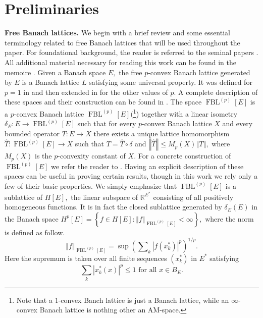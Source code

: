 \documentclass[12pt]{article}%
\begin{document}
\section{Preliminaries}

\textbf{Free Banach lattices. }We begin with a brief review and some essential
terminology related to free Banach lattices that will be used throughout the
paper. For foundational background, the reader is referred to the seminal
papers \cite{L-332,L-403}. All additional material necessary for reading this
work can be found in the memoire \cite{L-925}. Given a Banach space $E,$ the
free $p$-convex Banach lattice generated by $E$ is a Banach lattice $L$
satisfying some universal property. It was defined for $p=1$ in \cite{L-403}
and then extended in \cite{L-742} for the other values of $p.$ A complete
description of these spaces and their construction can be found in
\cite{L-925}. The space $\operatorname*{FBL}\nolimits^{(p)}\left[  E\right]  $
is a $p$-convex  Banach lattice $\operatorname*{FBL}\nolimits^{(p)}\left[
E\right]  ($\footnote{Note that a $1$-convex Banch lattice is just a Banach
lattice, while an $\infty$-convex Banach lattice is nothing other an
AM-space.}) together with a linear isometry $\delta_{E}:E\longrightarrow
\operatorname*{FBL}\nolimits^{(p)}\left[  E\right]  $ such that for every
$p$-convex Banach lattice $X$ and every bounded operator $T:E\longrightarrow
X$ there exists a unique lattice homomorphism $\widehat{T}:\operatorname*{FBL}%
\nolimits^{(p)}\left[  E\right]  \longrightarrow X$ such that $T=\widehat
{T}\circ\delta$ and $\left\Vert \widehat{T}\right\Vert \leq M_{p}\left(
X\right)  \left\Vert T\right\Vert ,$ where $M_{p}\left(  X\right)  $ is the
$p$-convexity constant of $X.$ For a concrete construction of
$\operatorname*{FBL}\nolimits^{(p)}\left[  E\right]  $ we refer the reader to
\cite[Theorem 2.1 and Proposition 2.2]{L-925}. Having an explicit description
of these spaces can be useful in proving certain results, though in this work
we rely only a few of their basic properties. We simply emphasize that
$\operatorname*{FBL}\nolimits^{(p)}\left[  E\right]  $ is a sublattice of
$H[E],$ the linear subspace of $\mathbb{R}^{E^{\ast}}$ consisting of all
positively homogeneous functions. It is in fact the closed sublattice
generated by $\delta_{E}\left(  E\right)  $ in the Banach space $H^{p}\left[
E\right]  =\left\{  f\in H\left[  E\right]  :\left\Vert f\right\Vert
_{\operatorname*{FBL}\nolimits^{(p)}\left[  E\right]  }<\infty\right\}  ,$
where the norm is defined as follow.%
\[
\left\Vert f\right\Vert _{\operatorname*{FBL}\nolimits^{(p)}\left[  E\right]
}=\sup\left(
{\textstyle\sum\nolimits_{k}}
\left\vert f\left(  x_{k}^{\ast}\right)  \right\vert ^{p}\right)  ^{1/p}.
\]
Here the supremum is taken over all finite sequences $\left(  x_{k}^{\ast
}\right)  $ in $E^{\ast}$ satisfying
\[
\sum\limits_{k}\left\vert x_{k}^{\ast}\left(  x\right)  \right\vert ^{p}%
\leq1\text{ for all }x\in B_{E}.
\]
\end{document}
